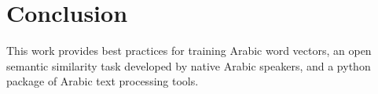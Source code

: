\section{Conclusion}

This work provides best practices for training Arabic word vectors, an open semantic similarity task developed by native Arabic speakers, and a python package of Arabic text processing tools.

\label{sec:conclusions}
